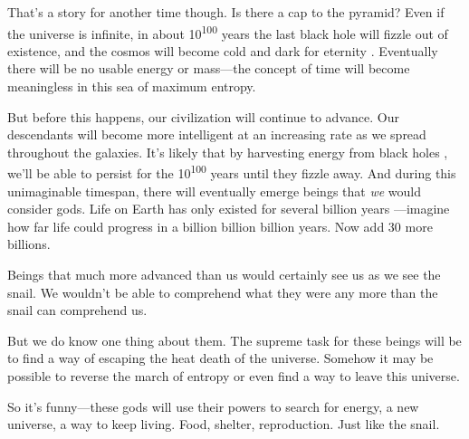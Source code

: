 \documentclass[12pt]{article}
\begin{document}
That’s a story for another time though. Is there a cap to the pyramid? Even if the universe is infinite, in about 10\textsuperscript{100} years the last black hole will fizzle out of existence, and the cosmos will become cold and dark for eternity \cite{frautschi1982entropy}. Eventually there will be no usable energy or mass—the concept of time will become meaningless in this sea of maximum entropy.

But before this happens, our civilization will continue to advance. Our descendants will become more intelligent at an increasing rate as we spread throughout the galaxies. It’s likely that by harvesting energy from black holes \cite{penrose1971extraction, press1972floating}, we’ll be able to persist for the 10\textsuperscript{100} years until they fizzle away. And during this unimaginable timespan, there will eventually emerge beings that \textit{we} would consider gods. Life on Earth has only existed for several billion years \cite{mojzsis1996evidence}—imagine how far life could progress in a billion billion billion years. Now add 30 more billions.

Beings that much more advanced than us would certainly see us as we see the snail. We wouldn’t be able to comprehend what they were any more than the snail can comprehend us.

But we do know one thing about them. The supreme task for these beings will be to find a way of escaping the heat death of the universe. Somehow it may be possible to reverse the march of entropy or even find a way to leave this universe.

So it’s funny—these gods will use their powers to search for energy, a new universe, a way to keep living. Food, shelter, reproduction. Just like the snail.




\end{document}
